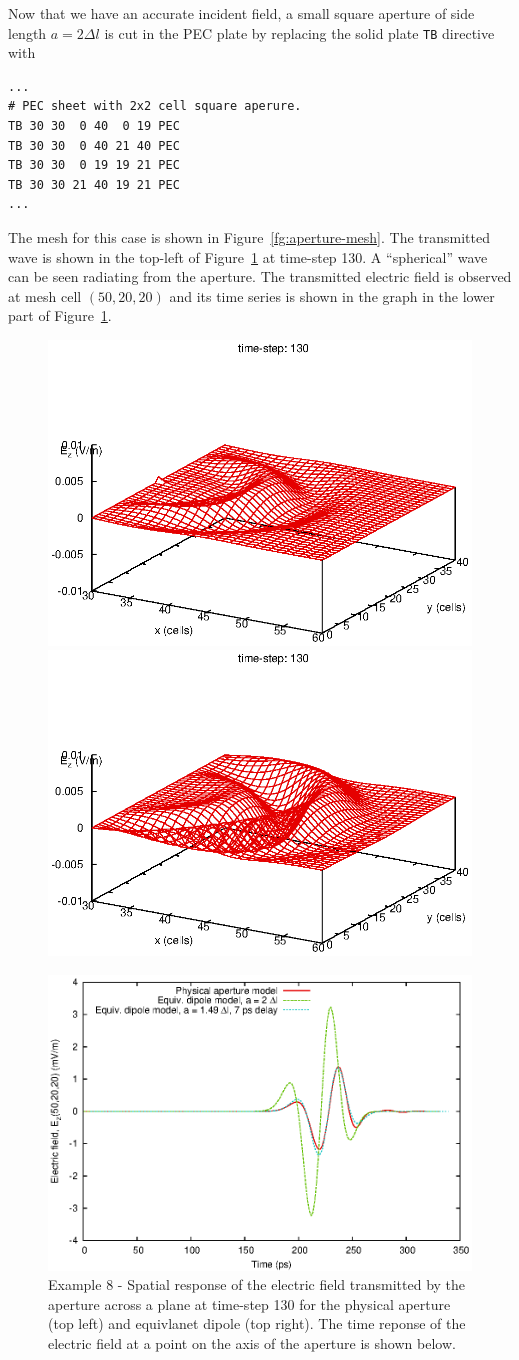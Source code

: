 \documentclass[onecolumn,a4paper]{article}
\numberwithin{equation}{section}
\begin{document}
Now that we have an accurate incident field, a small square aperture of side length $a=2\Delta l$ is cut 
in the PEC plate by replacing the solid plate \texttt{TB} directive with
\begin{verbatim}
...
# PEC sheet with 2x2 cell square aperure.
TB 30 30  0 40  0 19 PEC
TB 30 30  0 40 21 40 PEC
TB 30 30  0 19 19 21 PEC
TB 30 30 21 40 19 21 PEC
...
\end{verbatim}
The mesh for this case is shown in Figure~\ref{fg:aperture-mesh}. The transmitted wave is shown in the
top-left of Figure~\ref{fg:aperture-radiation} at time-step 130. A ``spherical'' wave can be seen radiating from
the aperture. The transmitted electric field is observed at mesh cell $(50,20,20)$ and its time series 
is shown in the graph in the lower part of Figure~\ref{fg:aperture-radiation}.

\begin{figure}[ht!]
 \includegraphics[width=0.49\linewidth]{figures/aperture-frame000130}
 \includegraphics[width=0.49\linewidth]{figures/aperture-equivdipole-frame000130}
 \centerline{\includegraphics[width=0.80\linewidth]{figures/aperture-Erad}} 
 \caption{\label{fg:aperture-radiation} Example 8 - Spatial response of the electric field transmitted by the aperture 
 across a plane at time-step 130 for the physical aperture (top left) and equivlanet dipole (top right).
 The time reponse of the electric field at a point on the axis of the aperture is shown below.}
\end{figure}
\end{document}
